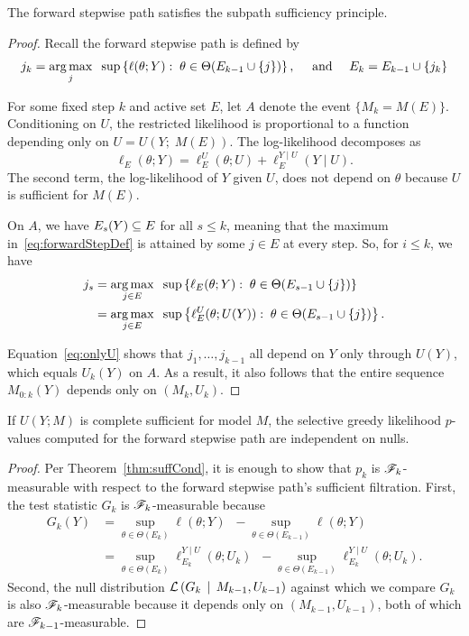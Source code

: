 \documentclass{article}
\begin{document}
\begin{proposition}\label{prop:forwardSSP}
  The forward stepwise path satisfies the subpath sufficiency principle.
\end{proposition}
\begin{proof}
  Recall the forward stepwise path is defined by
  \begin{equation}\label{eq:forwardStepDef}
    j_k = \operatorname*{arg\,max}_j \;\;\sup \left\{\ell(\theta; Y):\; \theta\in\Theta(E_{k-1} \cup \{j\})\right\}, \quad \text{ and } \quad
    E_k = E_{k-1} \cup \{j_k\}
  \end{equation}
  
  For some fixed step $k$ and active set $E$, let $A$ denote the event $\{M_k = M(E)\}$. Conditioning on $U$, the restricted likelihood is proportional to a function depending only on $U = U(Y; \;M(E))$. The log-likelihood decomposes as
  \[
  \ell_E(\theta; Y) = \ell_E^{U}(\theta; U) 
  + \ell_E^{Y \mid U}(Y \mid U).
  \]
  The second term, the log-likelihood of $Y$ given $U$, does not depend on $\theta$ because $U$ is sufficient for $M(E)$.

  On $A$, we have $E_s(Y) \subseteq E$ for all $s\leq k$, meaning that the maximum in~\eqref{eq:forwardStepDef} is attained by some $j\in E$ at every step. So, for $i \leq k$, we have
\begin{align}
  j_s &= \operatorname*{arg\,max}_{j\in E} \;\;\sup \left\{\ell_E(\theta; Y):\;
    \theta\in\Theta(E_{s-1} \cup \{j\})\right\} \\
  &= \operatorname*{arg\,max}_{j\in E} \;\;\sup \left\{\ell_E^U(\theta; U(Y)):\;
    \theta\in\Theta(E_{s-1} \cup \{j\})\right\}. \label{eq:onlyU}
\end{align}

Equation~\eqref{eq:onlyU} shows that $j_1,\ldots, j_{k-1}$ all depend on $Y$ only through $U(Y)$, which equals $U_k(Y)$ on $A$. As a result, it also follows that the entire sequence $M_{0:k}(Y)$ depends only on $(M_k, U_k)$.
\end{proof}

\begin{corollary}\label{cor:greedyLikIndep}
  If $U(Y; M)$ is complete sufficient for model $M$, the selective greedy likelihood $p$-values computed for the forward stepwise path are independent on nulls.
\end{corollary}
\begin{proof}
  Per Theorem~\ref{thm:suffCond}, it is enough to show that $p_k$ is $\mathscr{F}_k$-measurable with respect to the forward stepwise path's sufficient filtration. First, the test statistic $G_k$ is $\mathscr{F}_k$-measurable because
  \begin{align*}
    G_k(Y) &= \sup_{\theta\in \Theta(E_k)} {\ell(\theta; Y)} \;\;- \sup_{\theta\in \Theta(E_{k-1})} {\ell(\theta; Y)}\\
    &= \sup_{\theta\in \Theta(E_k)} {\ell_{E_k}^{Y\mid U}(\theta; U_k)} \;\;- \sup_{\theta\in \Theta(E_{k-1})} {\ell_{E_k}^{Y\mid U}(\theta; U_k)}.
  \end{align*}
  Second, the null distribution $\mathcal{L}\left(G_k \,\mid\, M_{k-1}, U_{k-1}\right)$ against which we compare $G_k$ is also $\mathscr{F}_k$-measurable because it depends only on $(M_{k-1}, U_{k-1})$, both of which are $\mathscr{F}_{k-1}$-measurable.
\end{proof}
\end{document}
